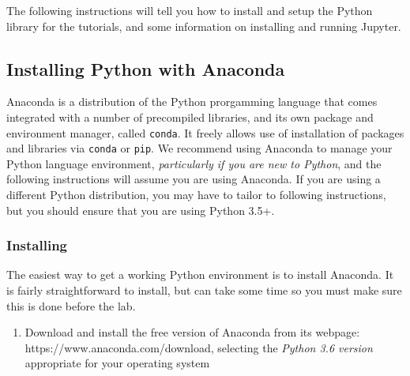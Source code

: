 \documentclass[11pt]{article}
\providecommand{\tightlist}{%
      \setlength{\itemsep}{0pt}\setlength{\parskip}{0pt}}
\begin{document}
The following instructions will tell you how to install and setup the
Python library for the tutorials, and some information on installing and
running Jupyter.

    \hypertarget{installing-python-with-anaconda}{%
\subsection{Installing Python with
Anaconda}\label{installing-python-with-anaconda}}

Anaconda is a distribution of the Python prorgamming language that comes
integrated with a number of precompiled libraries, and its own package
and environment manager, called \texttt{conda}. It freely allows use of
installation of packages and libraries via \texttt{conda} or
\texttt{pip}. We recommend using Anaconda to manage your Python language
environment, \emph{particularly if you are new to Python}, and the
following instructions will assume you are using Anaconda. If you are
using a different Python distribution, you may have to tailor to
following instructions, but you should ensure that you are using Python
3.5+.

\hypertarget{installing}{%
\subsubsection{Installing}\label{installing}}

The easiest way to get a working Python environment is to install
Anaconda. It is fairly straightforward to install, but can take some
time so you must make sure this is done before the lab.

\begin{enumerate}
\def\labelenumi{\arabic{enumi}.}
\tightlist
\item
  Download and install the free version of Anaconda from its webpage:
  https://www.anaconda.com/download, selecting the \emph{Python 3.6
  version} appropriate for your operating system
\end{enumerate}
\end{document}
